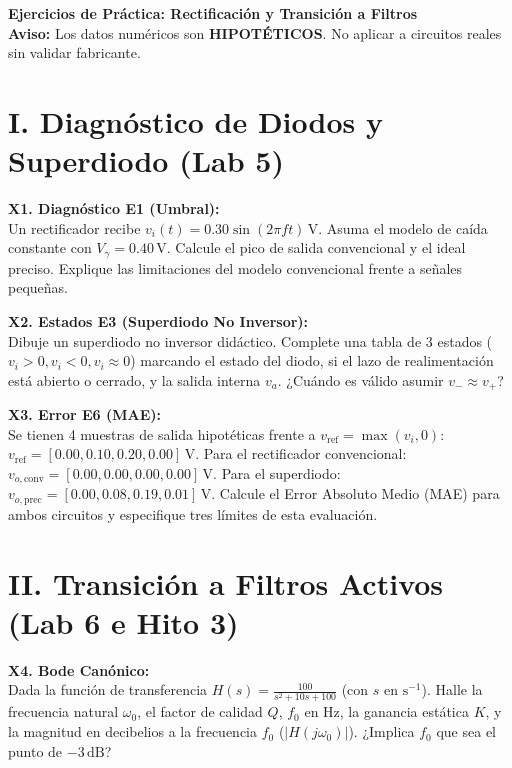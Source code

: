 \documentclass[10pt, a4paper]{article}
\begin{document}
\begin{center}
    {\Large\textbf{\textcolor{ucbblue}{Ejercicios de Práctica: Rectificación y Transición a Filtros}}} \\[0.1cm]
    {\footnotesize\textbf{Aviso:} Los datos numéricos son \textbf{HIPOTÉTICOS}. No aplicar a circuitos reales sin validar fabricante.}
\end{center}

\section*{I. Diagnóstico de Diodos y Superdiodo (Lab 5)}

\textbf{X1. Diagnóstico E1 (Umbral):}\\
Un rectificador recibe $v_i(t) = 0.30\sin(2\pi f t)\,\mathrm{V}$. Asuma el modelo de caída constante con $V_\gamma = 0.40\,\mathrm{V}$. Calcule el pico de salida convencional y el ideal preciso. Explique las limitaciones del modelo convencional frente a señales pequeñas.
\vspace{1.5cm}

\noindent\textbf{X2. Estados E3 (Superdiodo No Inversor):}\\
Dibuje un superdiodo no inversor didáctico. Complete una tabla de 3 estados ($v_i>0, v_i<0, v_i \approx 0$) marcando el estado del diodo, si el lazo de realimentación está abierto o cerrado, y la salida interna $v_a$. ¿Cuándo es válido asumir $v_- \approx v_+$?
\vspace{2cm}

\noindent\textbf{X3. Error E6 (MAE):}\\
Se tienen 4 muestras de salida hipotéticas frente a $v_{\mathrm{ref}} = \max(v_i, 0)$: $v_{\mathrm{ref}} = [0.00, 0.10, 0.20, 0.00]\,\mathrm{V}$.
Para el rectificador convencional: $v_{o,\mathrm{conv}} = [0.00, 0.00, 0.00, 0.00]\,\mathrm{V}$. Para el superdiodo: $v_{o,\mathrm{prec}} = [0.00, 0.08, 0.19, 0.01]\,\mathrm{V}$. Calcule el Error Absoluto Medio (MAE) para ambos circuitos y especifique tres límites de esta evaluación.
\vspace{2cm}

\section*{II. Transición a Filtros Activos (Lab 6 e Hito 3)}

\textbf{X4. Bode Canónico:}\\
Dada la función de transferencia $H(s) = \frac{100}{s^2 + 10s + 100}$ (con $s$ en $\mathrm{s}^{-1}$). Halle la frecuencia natural $\omega_0$, el factor de calidad $Q$, $f_0$ en $\mathrm{Hz}$, la ganancia estática $K$, y la magnitud en decibelios a la frecuencia $f_0$ ($|H(j\omega_0)|$). ¿Implica $f_0$ que sea el punto de $-3\,\mathrm{dB}$?
\vspace{2cm}
\end{document}

